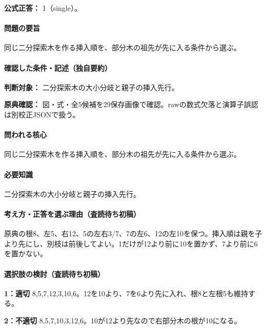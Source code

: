 \textbf{公式正答：} 1（single）。

\paragraph{問題の要旨} 同じ二分探索木を作る挿入順を、部分木の祖先が先に入る条件から選ぶ。

\paragraph{確認した条件・記述（独自要約）}\mbox{}\par

\noindent\textbf{判断対象：} 二分探索木の大小分岐と親子の挿入先行。\par

\noindent\textbf{原典確認：} 図・式・全5候補を29保存画像で確認。rawの数式欠落と演算子誤認は別校正JSONで扱う。\par

\paragraph{問われる核心} 同じ二分探索木を作る挿入順を、部分木の祖先が先に入る条件から選ぶ。

\paragraph{必要知識} 二分探索木の大小分岐と親子の挿入先行。

\paragraph{考え方・正答を選ぶ理由（査読待ち初稿）} 原典の根8、左5、右12、5の左右3/7、7の左6、12の左10を保つ。挿入順は親を子より先にし、別枝は前後してよい。1だけが12より前に10を置かず、7より前に6を置かない。

\paragraph{選択肢の検討（査読待ち初稿）}\mbox{}\par

\noindent\textbf{1：適切} 8,5,7,12,3,10,6。12を10より、7を6より先に入れ、根8と左根5も維持する。\par

\noindent\textbf{2：不適切} 8,5,7,10,3,12,6。10が12より先なので右部分木の根が10になる。\par

